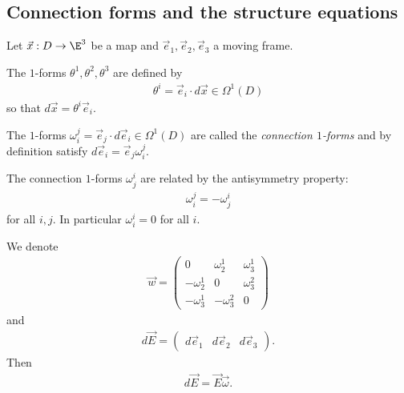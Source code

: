 \documentclass{article}
\begin{document}
\subsection{Connection forms and the structure equations}

Let $\vec x : D \to \E^3$ be a map and $\vec e_1,\vec e_2,\vec e_3$ a moving frame.

\begin{definition}
    The $1$-forms $\theta^1,\theta^2,\theta^3$ are defined by 
    \begin{align*}
        \theta^i = \vec e_i \cdot d\vec x \in \Omega^1(D)
    \end{align*}
    so that $d\vec x = \theta^i\vec e_i$.
\end{definition}

\begin{definition}
    The $1$-forms $\omega_i^j=\vec e_j\cdot d\vec e_i\in\Omega^1(D)$ are called the 
    \emph{connection $1$-forms} and by definition satisfy $d\vec e_i = \vec e_j\omega_i^j$.
\end{definition}

\begin{proposition}
    The connection $1$-forms $\omega_j^i$ are related by the antisymmetry property: 
    \begin{align*}
        \omega_i^j = -\omega_j^i
    \end{align*}
    for all $i,j$. In particular $\omega_i^i = 0$ for all $i$.
\end{proposition}

\begin{lemma}
    We denote 
    \begin{align*}
        \vec w = \begin{pmatrix}
            0           & \omega_2^1  & \omega_3^1 \\
            -\omega_2^1 & 0           & \omega_3^2 \\
            -\omega_3^1 & -\omega_3^2 & 0
        \end{pmatrix}
    \end{align*}
    and 
    \begin{align*}
        d\vec E = \begin{pmatrix}
            d\vec e_1 & d\vec e_2 & d\vec e_3
        \end{pmatrix}.
    \end{align*}
    Then 
    \begin{align*}
        d\vec E = \vec E\vec\omega.
    \end{align*}
\end{lemma}
\end{document}
